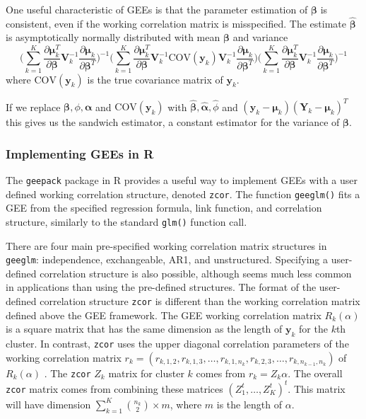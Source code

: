 \documentclass[12pt]{article}
\begin{document}
One useful characteristic of GEEs is that the parameter estimation of $\boldsymbol\beta$ is consistent, even if the working correlation matrix is misspecified. The estimate $\hat{\boldsymbol\beta}$ is asymptotically normally distributed with mean $\boldsymbol\beta$ and variance
$$ \big(\sum_{k=1}^K  \frac{\partial  \boldsymbol{\mu}_k^T }{\partial \boldsymbol\beta } \mathbf{V}_k^{-1} \frac{\partial  \boldsymbol\mu_k }{\partial \boldsymbol\beta^T } \big)^{-1} \bigg(\sum_{k=1}^K  \frac{\partial  \boldsymbol\mu_k^T }{\partial \boldsymbol\beta } \mathbf{V}_k^{-1}\text{COV}(\mathbf{y}_k)\mathbf{V}_{k}^{-1}  \frac{\partial  \boldsymbol\mu_k }{\partial \boldsymbol\beta^T } \bigg)\big(\sum_{k=1}^K  \frac{\partial  \boldsymbol\mu_k^T }{\partial \boldsymbol\beta } \mathbf{V}_k^{-1} \frac{\partial  \boldsymbol\mu_k }{\partial \boldsymbol\beta^T } \big)^{-1}$$
where $\text{COV}(\mathbf{y}_k)$ is the true covariance matrix of $\mathbf{y}_k$.

If we replace $ \boldsymbol\beta, \phi, \boldsymbol\alpha$ and $\text{COV}(\mathbf{y}_k)$ with $\hat{\boldsymbol\beta}, \hat {\boldsymbol\alpha}, \hat \phi$ and $(\mathbf{y}_k - \boldsymbol\mu_k)(\mathbf{Y}_k- \boldsymbol\mu_k)^T$ this gives us the sandwich estimator, a constant estimator for the variance of $\boldsymbol\beta$.


\subsubsection{Implementing GEEs in R}

The \texttt{geepack} package \cite{geepack} in R \cite{R} provides a useful way to implement GEEs with a user defined working correlation structure, denoted \texttt{zcor}. The function \texttt{geeglm()} fits a GEE from the specified regression formula, link function, and correlation structure, similarly to the standard \texttt{glm()} function call.

There are four main pre-specified working correlation matrix structures in \texttt{geeglm}: independence, exchangeable, AR1, and unstructured. Specifying a user-defined correlation structure is also possible, although seems much less common in applications than using the pre-defined structures. The format of the user-defined correlation structure \texttt{zcor} is different than the working correlation matrix defined above the GEE framework. The GEE working correlation matrix $R_k(\alpha)$ is a square matrix that has the same dimension as the length of $\mathbf{y}_k$ for the $k$th cluster. In contrast, \texttt{zcor} uses the upper diagonal correlation parameters of the working correlation matrix $r_k = (r_{k, 1,2}, r_{k,1,3}, \ldots , r_{k,1,n_k}, r_{k,2,3}, \ldots , r_{k,n_{k-1},n_k})$ of $R_{k}(\alpha)$ . The \texttt{zcor} $Z_k$ matrix for cluster $k$ comes from $r_k = Z_k \alpha$. The overall \texttt{zcor} matrix comes from combining these matrices $(Z_1^t, \ldots , Z_K^t)^t$. This matrix will have dimension $\sum_{k=1}^K \binom{n_k}{2} \times m$, where $m$ is the length of $\alpha$.
\end{document}
